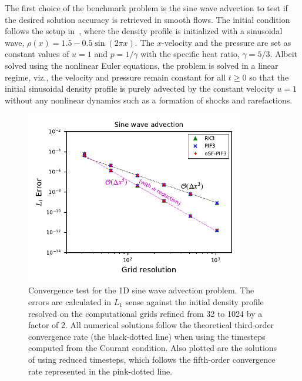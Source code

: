 The first choice of the benchmark problem is the sine wave advection
to test if the desired solution accuracy is retrieved in smooth flows.
The initial condition follows the setup in~\cite{lee2017piecewise},
where the density profile is initialized with a sinusoidal wave,
\( \rho (x) = 1.5 - 0.5\sin(2\pi x)\).
The $x$-velocity and
the pressure are set as constant values of \( u = 1\) and
\( p = 1/\gamma \)
with the specific heat ratio, \( \gamma = 5/3 \).
Albeit solved using the nonlinear Euler equations, the problem is
solved in a linear regime, viz., the velocity and pressure remain
constant for all $t\ge 0$ so that the initial sinusoidal density profile
is purely advected by the constant velocity $u=1$ without any nonlinear
dynamics such as a formation of shocks and rarefactions.

\begin{figure}
    \centering
    \includegraphics[width=0.85\textwidth]{fig/sine_over_dtReduction}
    \caption{Convergence test for the 1D sine wave advection problem.
        The errors are calculated
        in \( L_{1} \) sense against the initial density profile
        resolved on the computational grids refined
        from 32 to 1024 by a factor of 2.
        All numerical solutions follow the theoretical third-order convergence rate
        (the black-dotted line) when using the timesteps 
        computed from the Courant condition.
        Also plotted are the solutions of using reduced timesteps, which follows the
        fifth-order convergence rate represented in the pink-dotted line.
    }\label{fig:sine_wave}
\end{figure}

